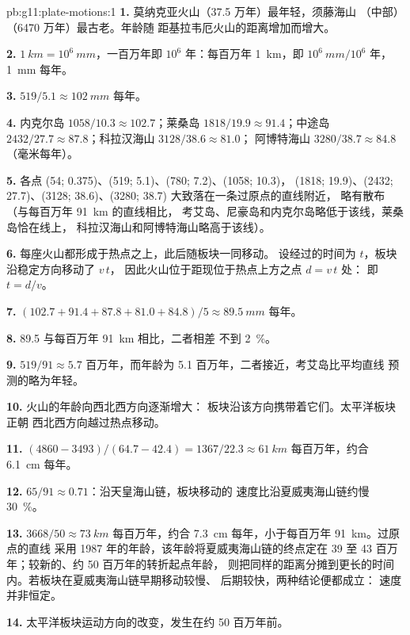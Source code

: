 \begin{solution}{pb:g11:plate-motions:1}
\textbf{1.} 莫纳克亚火山（37.5 万年）最年轻，须藤海山
（中部）（6470 万年）最古老。年龄随
距基拉韦厄火山的距离增加而增大。

\textbf{2.} $\qty{1}{km} = 10^6~\unit{mm}$，一百万年即 $10^6$
年：每百万年 \qty{1}{km}，即 $10^6~\unit{mm}/10^6$ 年，
\qty{1}{mm} 每年。

\textbf{3.} $519/5.1 \approx \qty{102}{mm}$ 每年。

\textbf{4.} 内克尔岛 $1058/10.3 \approx 102.7$；莱桑岛 $1818/19.9 \approx
91.4$；中途岛 $2432/27.7 \approx 87.8$；科拉汉海山 $3128/38.6 \approx 81.0$；
阿博特海山 $3280/38.7 \approx 84.8$（毫米每年）。

\textbf{5.} 各点 (54; 0.375)、(519; 5.1)、(780; 7.2)、(1058; 10.3)，
(1818; 19.9)、(2432; 27.7)、(3128; 38.6)、(3280; 38.7) 大致落在一条过原点的直线附近，
略有散布（与每百万年 \qty{91}{km} 的直线相比，
考艾岛、尼豪岛和内克尔岛略低于该线，莱桑岛恰在线上，
科拉汉海山和阿博特海山略高于该线）。

\textbf{6.} 每座火山都形成于热点之上，此后随板块一同移动。
设经过的时间为 $t$，板块沿稳定方向移动了 $v\,t$，
因此火山位于距现位于热点上方之点 $d = v\,t$ 处：
即 $t = d/v$。

\textbf{7.} $(102.7 + 91.4 + 87.8 + 81.0 + 84.8)/5 \approx \qty{89.5}{mm}$
每年。

\textbf{8.} 89.5 与每百万年 \qty{91}{km} 相比，二者相差
不到 \qty{2}{\percent}。

\textbf{9.} $519/91 \approx 5.7$ 百万年，而年龄为 \num{5.1}
百万年，二者接近，考艾岛比平均直线
预测的略为年轻。

\textbf{10.} 火山的年龄向西北西方向逐渐增大：
板块沿该方向携带着它们。太平洋板块正朝
西北西方向越过热点移动。

\textbf{11.} $(4860 - 3493)/(64.7 - 42.4) = 1367/22.3 \approx \qty{61}{km}$
每百万年，约合 \qty{6.1}{cm} 每年。

\textbf{12.} $65/91 \approx 0.71$：沿天皇海山链，板块移动的
速度比沿夏威夷海山链约慢 \qty{30}{\percent}。

\textbf{13.} $3668/50 \approx \qty{73}{km}$ 每百万年，约合
\qty{7.3}{cm} 每年，小于每百万年 \qty{91}{km}。过原点的直线
采用 1987 年的年龄，该年龄将夏威夷海山链的终点定在 39 至 43
百万年；较新的、约 50 百万年的转折起点年龄，
则把同样的距离分摊到更长的时间内。若板块在夏威夷海山链早期移动较慢、
后期较快，两种结论便都成立：
速度并非恒定。

\textbf{14.} 太平洋板块运动方向的改变，发生在约
50 百万年前。


\end{solution}
